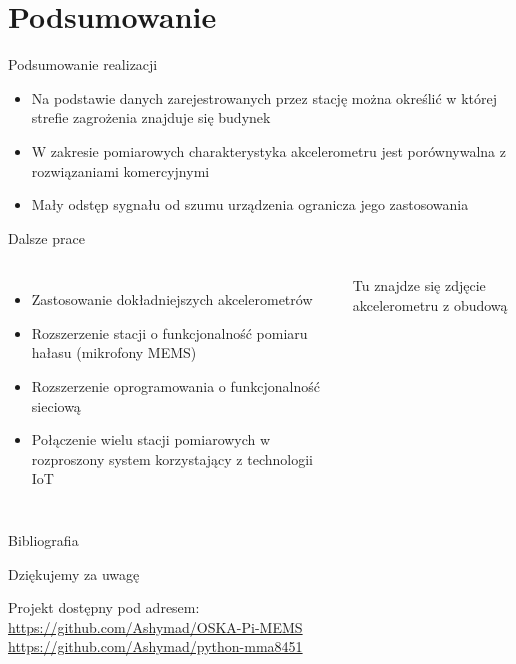 \documentclass[aspectratio=1610,polish]{beamer} %
\begin{document}
  \section{Podsumowanie}
  \begin{frame}{Podsumowanie realizacji}
    \begin{itemize}
      \item Na podstawie danych zarejestrowanych przez stację można określić w której strefie zagrożenia znajduje się budynek
      \item W zakresie pomiarowych charakterystyka akcelerometru jest porównywalna z rozwiązaniami komercyjnymi
      \item Mały odstęp sygnału od szumu urządzenia ogranicza jego zastosowania
    \end{itemize}
  \end{frame}
  \begin{frame}{Dalsze prace}
    \begin{columns}
      \begin{itemize}
        \item Zastosowanie dokładniejszych akcelerometrów
        \item Rozszerzenie stacji o funkcjonalność pomiaru hałasu (mikrofony MEMS)
        \item Rozszerzenie oprogramowania o funkcjonalność sieciową
        \item Połączenie wielu stacji pomiarowych w rozproszony system korzystający z technologii IoT
      \end{itemize}
      Tu znajdze się zdjęcie akcelerometru z obudową
    \end{columns} 
  \end{frame}
  \begin{frame}{Bibliografia}
    \nocite{*}
    \printbibliography
  \end{frame}
  \begin{frame}
    \centering
    \vspace*{40pt}

    {\huge Dziękujemy za uwagę}
    \vspace*{20pt}

    Projekt dostępny pod adresem:\\
    \url{https://github.com/Ashymad/OSKA-Pi-MEMS}
    \url{https://github.com/Ashymad/python-mma8451}
  \end{frame}
\end{document}
